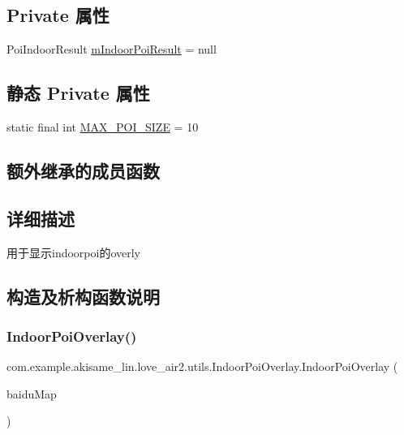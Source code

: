 \subsection*{Private 属性}
\begin{DoxyCompactItemize}
\item 
Poi\+Indoor\+Result \mbox{\hyperlink{classcom_1_1example_1_1akisame__lin_1_1love__air2_1_1utils_1_1_indoor_poi_overlay_a16f560f8a0f249d44e358d41923e8037}{m\+Indoor\+Poi\+Result}} = null
\end{DoxyCompactItemize}
\subsection*{静态 Private 属性}
\begin{DoxyCompactItemize}
\item 
static final int \mbox{\hyperlink{classcom_1_1example_1_1akisame__lin_1_1love__air2_1_1utils_1_1_indoor_poi_overlay_a2ce0e50791615f2012b04454da1120dc}{M\+A\+X\+\_\+\+P\+O\+I\+\_\+\+S\+I\+ZE}} = 10
\end{DoxyCompactItemize}
\subsection*{额外继承的成员函数}


\subsection{详细描述}
用于显示indoorpoi的overly 

\subsection{构造及析构函数说明}
\mbox{\label{classcom_1_1example_1_1akisame__lin_1_1love__air2_1_1utils_1_1_indoor_poi_overlay_a2d68adced3e033820fbd71626d1434aa}} 
\subsubsection{\texorpdfstring{IndoorPoiOverlay()}{IndoorPoiOverlay()}}
{\footnotesize\ttfamily com.\+example.\+akisame\+\_\+lin.\+love\+\_\+air2.\+utils.\+Indoor\+Poi\+Overlay.\+Indoor\+Poi\+Overlay (\begin{DoxyParamCaption}\item[{Baidu\+Map}]{baidu\+Map }\end{DoxyParamCaption})\hspace{0.3cm}{\ttfamily [inline]}}

